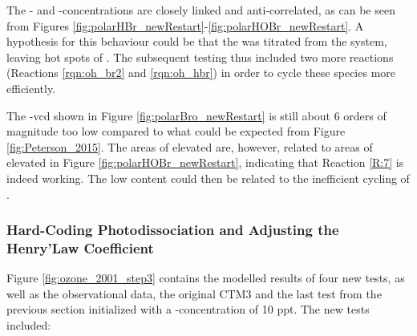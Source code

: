 \medskip

The - and -concentrations are closely linked and anti-correlated, as can be seen from Figures \ref{fig:polarHBr_newRestart}-\ref{fig:polarHOBr_newRestart}. A hypothesis for this behaviour could be that the  was titrated from the system, leaving hot spots of . The subsequent testing thus included two more reactions (Reactions \ref{rqn:oh_br2} and \ref{rqn:oh_hbr}) in order to cycle these species more efficiently. 

\medskip

The -\acrshort{vcd} shown in Figure \ref{fig:polarBro_newRestart} is still about 6 orders of magnitude too low compared to what could be expected from Figure \ref{fig:Peterson_2015}. The areas of elevated  are, however, related to areas of elevated  in Figure \ref{fig:polarHOBr_newRestart}, indicating that Reaction \ref{R:7} is indeed working. The low content could then be related to the inefficient cycling of . 


\subsubsection{Hard-Coding Photodissociation and Adjusting the Henry'Law Coefficient}\label{sec:disc_step3}

Figure \ref{fig:ozone_2001_step3} contains the modelled results of four new tests, as well as the observational data, the original CTM3 and the last test from the previous section initialized with a -concentration of 10 ppt. The new tests included: 

